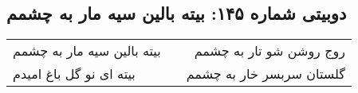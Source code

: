 \begin{center}
\section*{دوبیتی شماره ۱۴۵: بیته بالین سیه مار به چشمم}
\label{sec:145}
\begin{longtable}{l p{0.5cm} r}
بیته بالین سیه مار به چشمم
&&
روج روشن شو تار به چشمم
\\
بیته ای نو گل باغ امیدم
&&
گلستان سربسر خار به چشمم
\\
\end{longtable}
\end{center}

